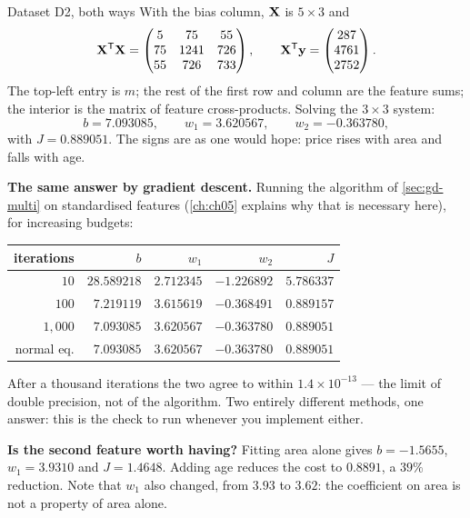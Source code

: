 \begin{workedexample}{Dataset D2, both ways}
With the bias column, $\mathbf{X}$ is $5\times 3$ and
\[
  \mathbf{X}^{\mathsf{T}}\mathbf{X} =
  \begin{pmatrix}
    5    & 75   & 55\\
    75   & 1241 & 726\\
    55   & 726  & 733
  \end{pmatrix},
  \qquad
  \mathbf{X}^{\mathsf{T}}\mathbf{y} =
  \begin{pmatrix} 287\\ 4761\\ 2752 \end{pmatrix}.
\]
The top-left entry is $m$; the rest of the first row and column are the feature
sums; the interior is the matrix of feature cross-products. Solving the
$3\times3$ system:
\[
  b = 7.093085,
  \qquad
  w_1 = 3.620567,
  \qquad
  w_2 = -0.363780 ,
\]
with $J = 0.889051$. The signs are as one would hope: price rises with area and
falls with age.

\textbf{The same answer by gradient descent.} Running the algorithm of
\cref{sec:gd-multi} on standardised features (\cref{ch:ch05} explains why that
is necessary here), for increasing budgets:

\begin{center}
\small
\renewcommand{\arraystretch}{1.1}
\begin{tabular}{@{}rrrrr@{}}
\toprule
iterations & $b$ & $w_1$ & $w_2$ & $J$\\
\midrule
$10$      & $28.589218$ & $2.712345$ & $-1.226892$ & $5.786337$\\
$100$     & $7.219119$  & $3.615619$ & $-0.368491$ & $0.889157$\\
$1{,}000$ & $7.093085$  & $3.620567$ & $-0.363780$ & $0.889051$\\
\midrule
normal eq.& $7.093085$  & $3.620567$ & $-0.363780$ & $0.889051$\\
\bottomrule
\end{tabular}
\end{center}

After a thousand iterations the two agree to within $1.4\times 10^{-13}$ --- the
limit of double precision, not of the algorithm. Two entirely different methods,
one answer: this is the check to run whenever you implement either.

\textbf{Is the second feature worth having?} Fitting area alone gives
$b = -1.5655$, $w_1 = 3.9310$ and $J = 1.4648$. Adding age reduces the cost to
$0.8891$, a $39\%$ reduction. Note that $w_1$ also changed, from $3.93$ to
$3.62$: the coefficient on area is not a property of area alone.
\end{workedexample}

